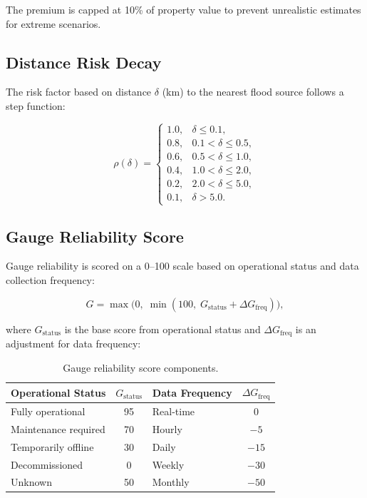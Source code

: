 \documentclass[11pt,a4paper]{article}
\begin{document}
\noindent The premium is capped at 10\% of property value to prevent unrealistic estimates for extreme scenarios.

\subsection{Distance Risk Decay}

The risk factor based on distance $\delta$ (km) to the nearest flood source follows a step function:

\[
\rho(\delta) =
\begin{cases}
1.0, & \delta \leq 0.1, \\
0.8, & 0.1 < \delta \leq 0.5, \\
0.6, & 0.5 < \delta \leq 1.0, \\
0.4, & 1.0 < \delta \leq 2.0, \\
0.2, & 2.0 < \delta \leq 5.0, \\
0.1, & \delta > 5.0.
\end{cases}
\]

\subsection{Gauge Reliability Score}

Gauge reliability is scored on a 0--100 scale based on operational status and data collection frequency:

\[
G = \max\!\big(0,\; \min(100,\; G_{\text{status}} + \Delta G_{\text{freq}})\big),
\]

\noindent where $G_{\text{status}}$ is the base score from operational status and $\Delta G_{\text{freq}}$ is an adjustment for data frequency:

\begin{table}[H]
\centering
\caption{Gauge reliability score components.}
\label{tab:gauge_reliability}
\begin{tabular}{lc|lc}
\toprule
\textbf{Operational Status} & $G_{\text{status}}$ & \textbf{Data Frequency} & $\Delta G_{\text{freq}}$ \\
\midrule
Fully operational      & 95  & Real-time & 0 \\
Maintenance required   & 70  & Hourly    & $-5$ \\
Temporarily offline    & 30  & Daily     & $-15$ \\
Decommissioned         & 0   & Weekly    & $-30$ \\
Unknown                & 50  & Monthly   & $-50$ \\
\bottomrule
\end{tabular}
\end{table}
\end{document}
